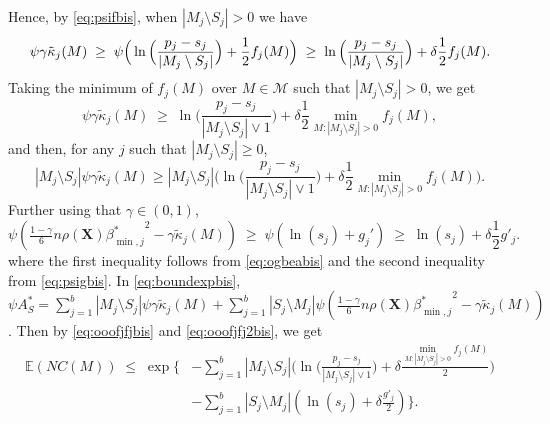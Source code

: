 \documentclass[
  12pt]{article}
\newcommand{\E}{\mathbb{E}}
\newcommand{\M}{\mathcal{M}}
\newcommand{\bX}{\mathbf{X}}
\begin{document}
Hence, by \eqref{eq:psifbis}, when $|M_j\setminus S_j|>0$ we have
\begin{equation*}
\psi\gamma\tilde{\kappa}_j(M) \;\geq\; \psi\Big(\ln\Big(\frac{p_j-s_j}{|M_j\setminus S_j|}\Big)+ \frac12f_j(M)\Big)\\ \;\geq\; \ln\Big(\frac{p_j-s_j}{|M_j\setminus S_j|}\Big)+ \delta\frac12f_j(M).
\end{equation*}
Taking the minimum of $f_j(M)$ over $M\in \M$ such that $|M_j\setminus S_j|>0$, we get
\begin{equation*}
\psi\gamma\tilde{\kappa}_j(M) \;\geq\;  \ln\Big(\frac{p_j-s_j}{|M_j\setminus S_j|\vee 1}\Big)+ \delta\frac12 \min_{M: |M_j\setminus S_j|>0}f_j(M),
\end{equation*}
and then, for any $j$ such that $|M_j \setminus S_j| \geq 0$,
\begin{equation}\label{eq:ooofjfjbis}
    |M_j\setminus S_j|\psi\gamma\tilde{\kappa}_j(M) \geq |M_j\setminus S_j|\Big(\ln\Big(\frac{p_j-s_j}{|M_j\setminus S_j|\vee 1}\Big)+ \delta\frac12\min_{M: |M_j\setminus S_j|>0}f_j(M)\Big).
\end{equation}
Further using that $\gamma \in(0,1)$,
\begin{equation}\label{eq:ooofjfj2bis}
\psi\left(\tfrac{1-\gamma}{6} n \rho(\bX) {\beta^*_{\min,j}}^{2} - \gamma\tilde{\kappa}_j(M)\right) \;\geq\; \psi\left(\ln(s_j)+g_j'\right) \;\geq\; \ln(s_j)+\delta \frac{1}{2}g'_j.
\end{equation}
where the first inequality follows from \eqref{eq:ogbeabis} and the second inequality from \eqref{eq:psigbis}. In \eqref{eq:boundexpbis}, $\psi A^*_S=\sum_{j=1}^b|M_j \setminus S_j|\psi\gamma\tilde{\kappa}_j(M) + \sum_{j=1}^b |S_j\setminus M_j |\psi\left(\tfrac{1-\gamma}{6} n \rho(\bX) {\beta^*_{\min,j}}^{2} - \gamma\tilde{\kappa}_j(M)\right)$. Then by \eqref{eq:ooofjfjbis} and \eqref{eq:ooofjfj2bis}, we get
\begin{align}\label{eq:fyvbis}
\E(NC(M))\;\leq\;\exp  \Bigg\{ & - \sum_{j=1}^b |M_j\setminus S_j|\big(\ln\big(\tfrac{p_j-s_j}{|M_j\setminus S_j|\vee 1}\big)+\delta \tfrac{\min_{M: |M_j\setminus S_j|>0}f_j(M)}{2}\big) \\ & -\sum_{j=1}^b |S_j\setminus M_j|(\ln(s_j)+\delta \tfrac{g'_j}{2})\Bigg\}.    \nonumber
\end{align}
\end{document}
